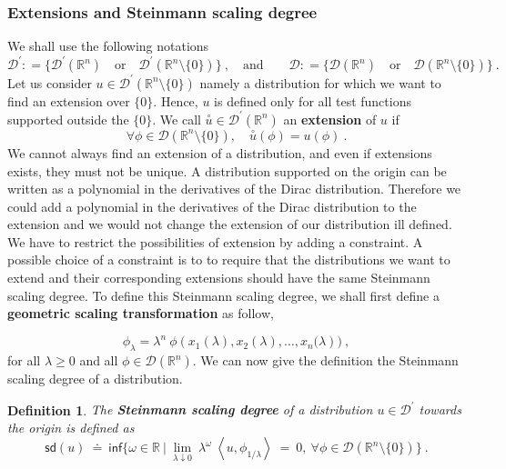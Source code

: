 \documentclass[11pt]{book}
\newcommand{\sd}{\mathsf{sd}}
\renewcommand{\inf}{\mathsf{inf}}
\newcommand{\sm}[1]{\left\langle#1\right\rangle}
\newcommand{\exte}[1]{\overset{\circ}{#1}}
\newcommand{\Dcal}{\mathcal{D}}
\newcommand{\Rbb}{\mathbb{R}}
\theoremstyle{break}
\newtheorem{definition}{Definition}[chapter]
\begin{document}
\subsubsection{Extensions and Steinmann scaling degree}


We shall use the following notations
%
\begin{equation*}
\Dcal^\prime : = \bigg\{ \Dcal^\prime(\Rbb^n) \quad \mbox{or} \quad \Dcal^\prime(\Rbb^n\setminus\{0\}) \bigg\} \ , \quad \mbox{and} \qquad \Dcal : = \bigg\{ \Dcal(\Rbb^n) \quad \mbox{or} \quad \Dcal(\Rbb^n\setminus\{0\}) \bigg\} \ .
\end{equation*}
%
Let us consider $u\in \Dcal^\prime(\Rbb^n \setminus \{0\})$ namely a distribution for which we want to find an extension over $\{0\}$. Hence, $u$ is defined only for all test functions supported outside the $\{0\}$. We call $\exte{u} \in \Dcal^\prime(\Rbb^n)$ an \textbf{extension} of $u$ if 
%
\begin{equation*}
 \forall \phi \in \Dcal\left(\Rbb^n \setminus \{0\} \right), \quad \exte{u}(\phi) = u(\phi) \ .
\end{equation*}
%
We cannot always find an extension of a distribution, and even if extensions exists, they must not be unique. A distribution supported on the origin can be written as a polynomial in the derivatives of the Dirac distribution. Therefore we could add a polynomial in the derivatives of the Dirac distribution to the extension and we would not change the extension of our distribution ill defined. We have to restrict the possibilities of extension by adding a constraint. A possible choice of a constraint is to to require that the distributions we want to extend and their corresponding extensions should have the same Steinmann scaling degree. To define this Steinmann scaling degree, we shall first define a \textbf{geometric scaling transformation} as follow,
%



\begin{equation}
\phi_\lambda = \lambda^{n} \ \phi\left(x_1(\lambda ),x_2(\lambda) , \dots , x_n(\lambda\right)) \ ,
\label{eq:geo_scaling_transfo_numeric}
\end{equation}
%
for all $\lambda \geq 0$ and all $\phi \in \Dcal(\Rbb^n)$. We can now give the definition the Steinmann scaling degree of a distribution.


\begin{definition}\label{def:steinmann_scaling_degree}
The \textbf{Steinmann scaling degree} of a distribution $u \in \Dcal^\prime$ towards the origin is defined as 
%
\begin{equation*}
\sd(u) \ \doteq \ \inf\bigg\{ \omega \in \Rbb \ \bigg| \ \lim_{\lambda \downarrow 0} \ \lambda^\omega \ \sm{u,\phi_{1/\lambda}} \ = \ 0, \ \forall \phi\in\Dcal(\Rbb^n \setminus \{0\}) \bigg\} \ .
\end{equation*}
%
\end{definition}
\end{document}
